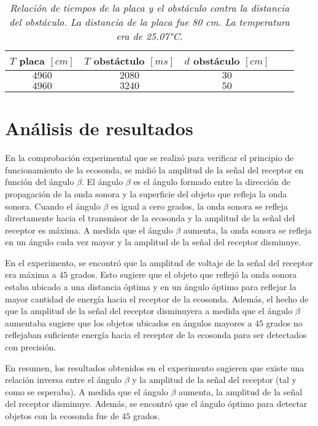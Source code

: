 \documentclass[spanish,notitlepage,letterpaper, 12pt]{article}
\begin{document}
\begin{table}[!ht]
    \centering
    \begin{tabular}{|c|c|c|c|c|}
        \hline
        $T$ placa $[cm]$ & $T$ obstáctulo $[ms]$ & $d$ obstáculo $[cm]$\\
        \hline\hline
        $4960$ & $2080$ & $30$\\
        $4960$ & $3240$ & $50$\\
        \hline
    \end{tabular}
    \label{tab:periods}
    \caption{\textit{Relación de tiempos de la placa y el obstáculo contra la distancia del obstáculo. La distancia de la placa fue 80 cm. La temperatura era de 25.07°C.}}
\end{table}
\section{Análisis de resultados}
En la comprobación experimental que se realizó para verificar el principio de funcionamiento de la ecosonda, se midió la amplitud de la señal del receptor en función del ángulo $\beta$. El ángulo $\beta$ es el ángulo formado entre la dirección de propagación de la onda sonora y la superficie del objeto que
refleja la onda sonora. Cuando el ángulo $\beta$ es igual a cero grados, la onda sonora se refleja directamente hacia el transmisor de la ecosonda y la amplitud de la señal del receptor es máxima. A medida que el ángulo $\beta$ aumenta, la onda sonora se refleja en un ángulo cada vez mayor y la amplitud de la
señal del receptor disminuye.\par
\bigskip
En el experimento, se encontró que la amplitud de voltaje de la señal del receptor era máxima a $45$ grados. Esto sugiere que el objeto que reflejó la onda sonora estaba ubicado a una distancia óptima y en un ángulo óptimo para reflejar la mayor cantidad de energía hacia el receptor de la ecosonda.
Además, el hecho de que la amplitud de la señal del receptor disminuyera a medida que el ángulo $\beta$ aumentaba sugiere que los objetos ubicados en ángulos mayores a $45$ grados no reflejaban suficiente energía hacia el receptor de la ecosonda para ser detectados con precisión.\par
\bigskip
En resumen, los resultados obtenidos en el experimento sugieren que existe una relación inversa entre el ángulo $\beta$ y la amplitud de la señal del receptor (tal y como se esperaba). A medida que el ángulo $\beta$ aumenta, la amplitud de la señal del receptor disminuye. Además, se encontró que el
ángulo óptimo para detectar objetos con la ecosonda fue de $45$ grados.
\end{document}
